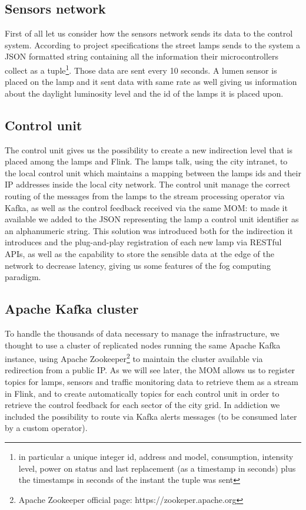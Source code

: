 \subsection{Sensors network}
First of all let us consider how the sensors network sends its data to the control system. According to project specifications the street lamps sends to the system a JSON formatted string containing all the information their microcontrollers collect as a tuple\footnote{in particular a unique integer id, address and model, consumption, intensity level, power on status and last replacement (as a timestamp in seconds) plus the timestamps in seconds of the instant the tuple was sent}. Those data are sent every 10 seconds. A lumen sensor is placed on the lamp and it sent data with same rate as well giving us information about the daylight luminosity level and the id of the lamps it is placed upon.

\subsection{Control unit}
The control unit gives us the possibility to create a new indirection level that is placed among the lamps and Flink. The lamps talk, using the city intranet, to the local control unit which maintains a mapping between the lamps ids and their IP addresses inside the local city network. The control unit manage the correct routing of the messages from the lamps to the stream processing operator via Kafka, as well as the control feedback received via the same MOM: to made it available we added to the JSON representing the lamp a control unit identifier as an alphanumeric string. This solution was introduced both for the indirection it introduces and the plug-and-play registration of each new lamp via RESTful APIs, as well as the capability to store the sensible data at the edge of the network to decrease latency, giving us some features of the fog computing paradigm.

\subsection{Apache Kafka cluster}
To handle the thousands of data necessary to manage the infrastructure, we thought to use a cluster of replicated nodes running the same Apache Kafka instance, using Apache Zookeeper\footnote{Apache Zookeeper official page: https://zookeper.apache.org} to maintain the cluster available via redirection from a public IP. As we will see later, the MOM allows us to register topics for lamps, sensors and traffic monitoring data to retrieve them as a stream in Flink, and to create automatically topics for each control unit in order to retrieve the control feedback for each sector of the city grid. In addiction we included the possibility to route via Kafka alerts messages (to be consumed later by a custom operator).

